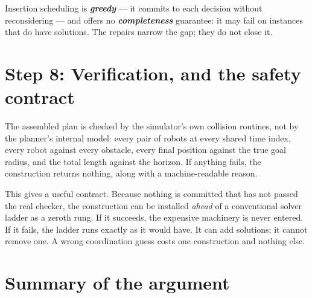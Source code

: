 \documentclass[11pt,a4paper]{article}
\newcommand{\defn}[1]{\textbf{\textit{#1}}}
\begin{document}
Insertion scheduling is \defn{greedy} --- it commits to each decision without reconsidering
--- and offers no \defn{completeness} guarantee: it may fail on instances that do have
solutions. The repairs narrow the gap; they do not close it.

\section{Step 8: Verification, and the safety contract}
\label{sec:verify}

The assembled plan is checked by the simulator's own collision routines, not by the
planner's internal model: every pair of robots at every shared time index, every robot
against every obstacle, every final position against the true goal radius, and the total
length against the horizon. If anything fails, the construction returns nothing, along with
a machine-readable reason.

This gives a useful contract. Because nothing is committed that has not passed the real
checker, the construction can be installed \emph{ahead} of a conventional solver ladder as a
zeroth rung. If it succeeds, the expensive machinery is never entered. If it fails, the
ladder runs exactly as it would have. It can add solutions; it cannot remove one. A wrong
coordination guess costs one construction and nothing else.

\section{Summary of the argument}
\end{document}
